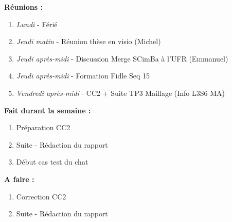 \textbf{Réunions :}
\begin{enumerate}[label=\textbullet]
	\item \textit{Lundi} - Férié
	\item \textit{Jeudi matin} - Réunion thèse en visio (Michel)
	\item \textit{Jeudi après-midi} - Discussion Merge SCimBa à l'UFR (Emmanuel)
	\item \textit{Jeudi après-midi} - Formation Fidle Seq 15
	\item \textit{Vendredi après-midi} - CC2 + Suite TP3 Maillage (Info L3S6 MA)
\end{enumerate}
\textbf{Fait durant la semaine :}
\begin{enumerate}[label=\textbullet]
	\item Préparation CC2
	\item Suite - Rédaction du rapport
	\item Début cas test du chat
\end{enumerate}
\textbf{A faire :}
\begin{enumerate}[label=\textbullet]
	\item Correction CC2
	\item Suite - Rédaction du rapport
\end{enumerate}
